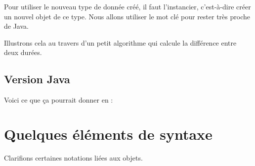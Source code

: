 		Pour utiliser le nouveau type de donnée créé,
		il faut l'instancier, c'est-à-dire créer un nouvel objet de ce type.
		Nous allons utiliser le mot clé \lda{\New} pour rester très proche de Java.
		
		Illustrons cela au travers d'un petit algorithme
		qui calcule la différence entre deux durées.
		
		\begin{algo}
		\end{algo}

	\subsection{Version Java}

	Voici ce que ça pourrait donner en  :

\section{Quelques éléments de syntaxe}

	Clarifions certaines notations liées aux objets.

